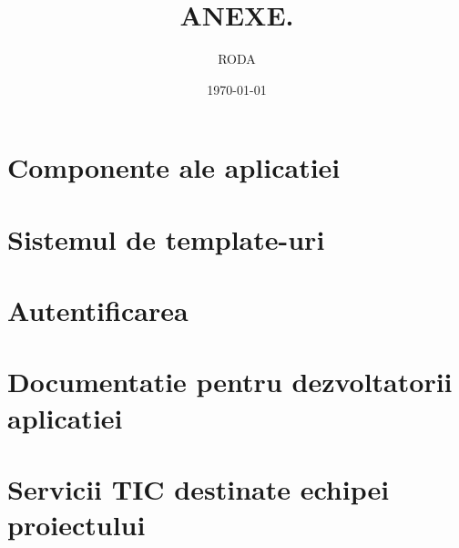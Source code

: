 \documentclass[11pt,twoside,romanian]{extbook}
\begin{document}
\fancyhead[RE,LO]{\thepage}
\title{ANEXE.}
\author{RODA}
\date{\today}
\maketitle
\newpage
\thispagestyle{plain}
\tableofcontents{}
\setcounter{page}{1}

\chapter{Componente ale aplicatiei}


\chapter{Sistemul de template-uri} 


\chapter{Autentificarea} 


\chapter{Documentatie pentru dezvoltatorii aplicatiei} 


\chapter{Servicii TIC destinate echipei proiectului}

\end{document}
